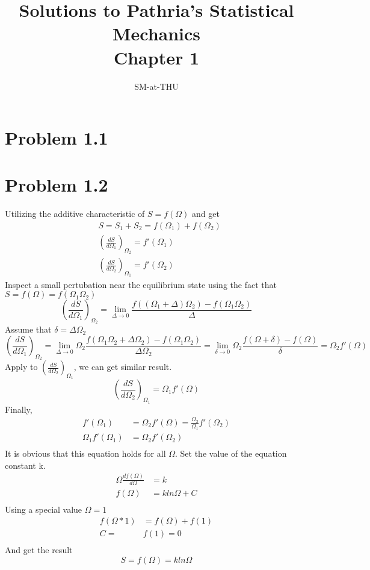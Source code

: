 \documentclass{article}
\author{SM-at-THU}
\title{\bf{Solutions to Pathria's Statistical Mechanics}\\Chapter 1}
\begin{document}
\maketitle
\section*{Problem 1.1}

\section*{Problem 1.2}
Utilizing the additive characteristic of $S=f(\Omega)$ and get
\begin{align}
&S=S_1+S_2=f(\Omega_1)+f(\Omega_2)\\
&(\frac{dS}{d\Omega_1})_{\Omega_2}=f'(\Omega_1)\\
&(\frac{dS}{d\Omega_2})_{\Omega_1}=f'(\Omega_2)
\end{align}
Inspect a small pertubation near the equilibrium state using the fact that $S=f(\Omega)=f(\Omega_1\Omega_2)$
\begin{equation}
(\frac{dS}{d\Omega_1})_{\Omega_2}=\lim_{\Delta\rightarrow 0}{\frac{f((\Omega_1+\Delta)\Omega_2)-f(\Omega_1\Omega_2)}{\Delta}}
\end{equation}
Assume that $\delta=\Delta\Omega_2$
\begin{equation}
(\frac{dS}{d\Omega_1})_{\Omega_2}=\lim_{\Delta\rightarrow 0}{\Omega_2\frac{f(\Omega_1\Omega_2+\Delta\Omega_2)-f(\Omega_1\Omega_2)}{\Delta\Omega_2}}=\lim_{\delta\rightarrow 0}{\Omega_2\frac{f(\Omega+\delta)-f(\Omega)}{\delta}}=\Omega_2f'(\Omega)
\end{equation}
Apply to $(\frac{dS}{d\Omega_2})_{\Omega_1}$, we can get similar result.
\begin{equation}
(\frac{dS}{d\Omega_2})_{\Omega_1}=\Omega_1f'(\Omega)
\end{equation}
Finally,
\begin{align}
f'(\Omega_1)&=\Omega_2f'(\Omega)=\frac{\Omega_2}{\Omega_1}f'(\Omega_2)\\
\Omega_1f'(\Omega_1)&=\Omega_2f'(\Omega_2)\\
\end{align}
It is obvious that this equation holds for all $\Omega$. Set the value of the equation constant k.
\begin{align}
\Omega\frac{df(\Omega)}{d\Omega}&=k\\
f(\Omega)&=kln\Omega+C\\
\end{align}
Using a special value $\Omega=1$
\begin{align}
f(\Omega*1)&=f(\Omega)+f(1)\\
C=&f(1)=0\\
\end{align}
And get the result
\begin{equation}
S=f(\Omega)=kln\Omega
\end{equation}
\end{document}

